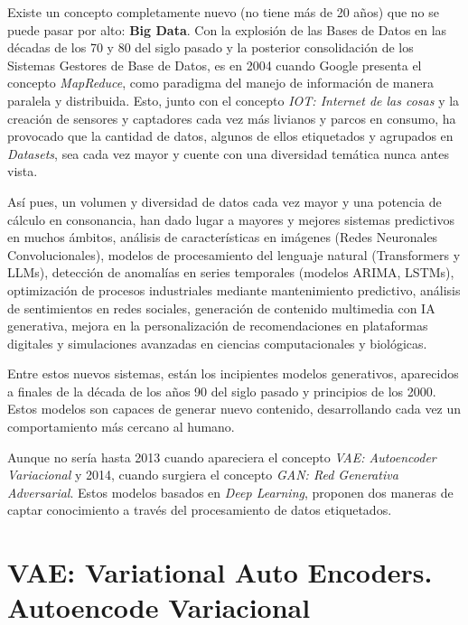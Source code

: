 Existe un concepto completamente nuevo (no tiene más de 20 años) que no se puede pasar por alto: \textbf{Big Data}. Con la explosión de las Bases de Datos en las décadas de los 70 y 80 del siglo pasado y la posterior consolidación de los Sistemas Gestores de Base de Datos, es en 2004 cuando Google presenta el concepto \emph{MapReduce}, como paradigma del manejo de información de manera paralela y distribuida. Esto, junto con el concepto \emph{IOT: Internet de las cosas} y la creación de sensores y captadores cada vez más livianos y parcos en consumo, ha provocado que la cantidad de datos, algunos de ellos etiquetados y agrupados en \emph{Datasets}, sea cada vez mayor y cuente con una diversidad temática nunca antes vista.

Así pues, un volumen y diversidad de datos cada vez mayor y una potencia de cálculo en consonancia, han dado lugar a mayores y mejores sistemas predictivos en muchos ámbitos, análisis de características en imágenes (Redes Neuronales Convolucionales), modelos de procesamiento del lenguaje natural (Transformers y LLMs), detección de anomalías en series temporales (modelos ARIMA, LSTMs), optimización de procesos industriales mediante mantenimiento predictivo, análisis de sentimientos en redes sociales, generación de contenido multimedia con IA generativa, mejora en la personalización de recomendaciones en plataformas digitales y simulaciones avanzadas en ciencias computacionales y biológicas.

Entre estos nuevos sistemas, están los incipientes modelos generativos, aparecidos a finales de la década de los años 90 del siglo pasado y principios de los 2000. Estos modelos son capaces de generar nuevo contenido, desarrollando cada vez un comportamiento más cercano al humano.

Aunque no sería hasta 2013 cuando apareciera el concepto \emph{VAE: Autoencoder Variacional} y 2014, cuando surgiera el concepto \emph{GAN: Red Generativa Adversarial}. Estos modelos basados en \emph{Deep Learning}, proponen dos maneras de captar conocimiento a través del procesamiento de datos etiquetados.

\section{VAE: Variational Auto Encoders. Autoencode Variacional}

